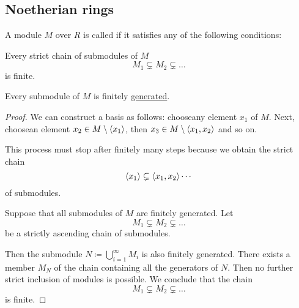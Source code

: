 \subsection{Noetherian rings}\label{subsec:noetherian_rings}

\begin{definition}\label{def:noetherian_module}
  A module \( M \) over \( R \) is called  if it satisfies any of the following conditions:
  \begin{DefEnum}
     Every strict chain of submodules of \( M \)
    \begin{equation*}
      M_1 \subsetneq M_2 \subsetneq \ldots
    \end{equation*}
    is finite.

     Every submodule of \( M \) is finitely \hyperref[def:free_left_module]{generated}.
  \end{DefEnum}
\end{definition}
\begin{proof}
   We can construct a basis as follows: choose\AOC any element \( x_1 \) of \( M \). Next, choose\AOC an element \( x_2 \in M \setminus \left\langle x_1 \right\rangle \), then \( x_3 \in M \setminus \left\langle x_1, x_2 \right\rangle \) and so on.

  This process must stop after finitely many steps because we obtain the strict chain
  \begin{equation*}
    \left\langle x_1 \right\rangle \subsetneq \left\langle x_1, x_2 \right\rangle \cdots
  \end{equation*}
  of submodules.

   Suppose that all submodules of \( M \) are finitely generated. Let
  \begin{equation*}
    M_1 \subsetneq M_2 \subsetneq \ldots
  \end{equation*}
  be a strictly ascending chain of submodules.

  Then the submodule \( N \coloneqq \bigcup_{i=1}^\infty M_i \) is also finitely generated. There exists a member \( M_N \) of the chain containing all the generators of \( N \). Then no further strict inclusion of modules is possible. We conclude that the chain
  \begin{equation*}
    M_1 \subsetneq M_2 \subsetneq \ldots
  \end{equation*}
  is finite.
\end{proof}

